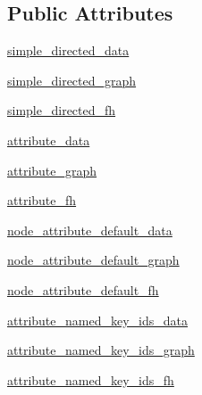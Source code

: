 \subsection*{Public Attributes}
\begin{DoxyCompactItemize}
\item 
\hyperlink{classnetworkx_1_1readwrite_1_1tests_1_1test__graphml_1_1BaseGraphML_af200fb91139be74a8a57e2f00f6ef5a1}{simple\+\_\+directed\+\_\+data}
\item 
\hyperlink{classnetworkx_1_1readwrite_1_1tests_1_1test__graphml_1_1BaseGraphML_aec62afc8915c7a1dae20e8567bf6c46b}{simple\+\_\+directed\+\_\+graph}
\item 
\hyperlink{classnetworkx_1_1readwrite_1_1tests_1_1test__graphml_1_1BaseGraphML_aca7931c3e04e3b1a5301a121c23fa121}{simple\+\_\+directed\+\_\+fh}
\item 
\hyperlink{classnetworkx_1_1readwrite_1_1tests_1_1test__graphml_1_1BaseGraphML_afe15deb852992520b02b99f21e8f7f70}{attribute\+\_\+data}
\item 
\hyperlink{classnetworkx_1_1readwrite_1_1tests_1_1test__graphml_1_1BaseGraphML_a106d3acdb6441dc2b898aad15b2710d9}{attribute\+\_\+graph}
\item 
\hyperlink{classnetworkx_1_1readwrite_1_1tests_1_1test__graphml_1_1BaseGraphML_a958d53aa8570451511f0106df0982f1d}{attribute\+\_\+fh}
\item 
\hyperlink{classnetworkx_1_1readwrite_1_1tests_1_1test__graphml_1_1BaseGraphML_a77e73bc00a83314da299f79e026e3748}{node\+\_\+attribute\+\_\+default\+\_\+data}
\item 
\hyperlink{classnetworkx_1_1readwrite_1_1tests_1_1test__graphml_1_1BaseGraphML_aad2c4dd5f0de6a99f821e4b70530c719}{node\+\_\+attribute\+\_\+default\+\_\+graph}
\item 
\hyperlink{classnetworkx_1_1readwrite_1_1tests_1_1test__graphml_1_1BaseGraphML_a5954915d7c32b5e207f3a174681b8371}{node\+\_\+attribute\+\_\+default\+\_\+fh}
\item 
\hyperlink{classnetworkx_1_1readwrite_1_1tests_1_1test__graphml_1_1BaseGraphML_ababa52e614fd717adf14a716041097a7}{attribute\+\_\+named\+\_\+key\+\_\+ids\+\_\+data}
\item 
\hyperlink{classnetworkx_1_1readwrite_1_1tests_1_1test__graphml_1_1BaseGraphML_a2e796b929ed61495ec33190c2dfa5d89}{attribute\+\_\+named\+\_\+key\+\_\+ids\+\_\+graph}
\item 
\hyperlink{classnetworkx_1_1readwrite_1_1tests_1_1test__graphml_1_1BaseGraphML_a03491d13e9ec38612c5d5c52b77182c1}{attribute\+\_\+named\+\_\+key\+\_\+ids\+\_\+fh}

\end{DoxyCompactItemize}
